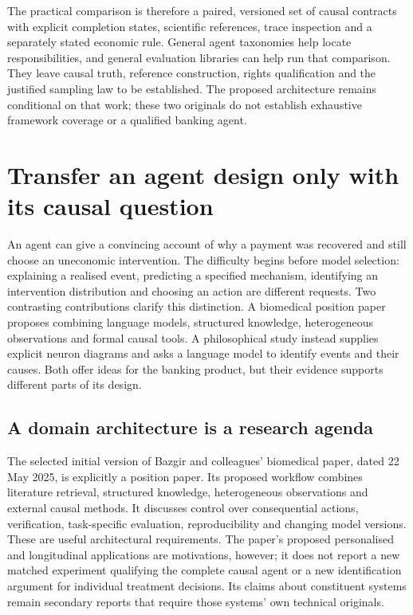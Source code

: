 The practical comparison is therefore a paired, versioned set of causal
contracts with explicit completion states, scientific references, trace
inspection and a separately stated economic rule. General agent taxonomies
help locate responsibilities, and general evaluation libraries can help
run that comparison. They leave causal truth, reference construction,
rights qualification and the justified sampling law to be established.
The proposed architecture remains conditional on that work; these two
originals do not establish exhaustive framework coverage or a qualified
banking agent.


\section{Transfer an agent design only with its causal question}
\label{exec18:reasoning-transfer}
An agent can give a convincing account of why a payment was recovered and
still choose an uneconomic intervention. The difficulty begins before model
selection: explaining a realised event, predicting a specified mechanism,
identifying an intervention distribution and choosing an action are different
requests. Two contrasting contributions clarify this distinction. A biomedical
position paper proposes combining language models, structured knowledge,
heterogeneous observations and formal causal tools. A philosophical study
instead supplies explicit neuron diagrams and asks a language model to identify
events and their causes. Both offer ideas for the banking product, but their
evidence supports different parts of its design.~\citep{exec18_reasoning_biomedical,exec18_reasoning_neuron}

\subsection{A domain architecture is a research agenda}
The selected initial version of Bazgir and colleagues' biomedical paper,
dated 22 May 2025, is explicitly a position paper. Its proposed workflow
combines literature retrieval, structured knowledge, heterogeneous observations
and external causal methods. It discusses control over consequential actions,
verification, task-specific evaluation, reproducibility and changing model
versions. These are useful architectural requirements. The paper's proposed
personalised and longitudinal applications are motivations, however; it does
not report a new matched experiment qualifying the complete causal agent or a
new identification argument for individual treatment decisions. Its claims
about constituent systems remain secondary reports that require those systems'
own technical originals.~\citep{exec18_reasoning_biomedical}

